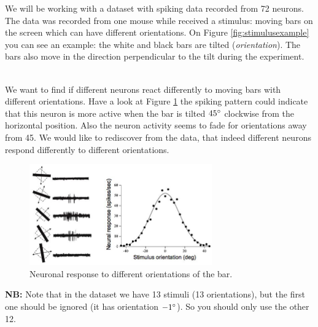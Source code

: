 \documentclass[a4paper,11pt]{article}
\begin{document}
We will be working with a dataset with spiking data recorded from 72 neurons. The data was recorded from one mouse while received a stimulus: moving bars on the screen which can have different orientations. On Figure \ref{fig:stimulusexample} you can see an example: the white and black bars are tilted (\emph{orientation}). The bars also move in the direction perpendicular to the tilt during the experiment. 

\ \\
We want to find if different neurons react differently to moving bars with different orientations. Have a look at Figure \ref{fig:orientationresponse} the spiking pattern could indicate that this neuron is more active when the bar is tilted $45\degree$ clockwise from the horizontal position. Also the neuron activity seems to fade for orientations away from 45. We would like to rediscover from the data, that indeed different neurons respond differently to different orientations.

\begin{figure}[H]
	\centering
	\includegraphics[width=0.7\textwidth]{orientation.jpg} 
	\caption{Neuronal response to different orientations of the bar.}
	\label{fig:orientationresponse}
\end{figure}
\textbf{NB:} Note that in the dataset we have 13 stimuli (13 orientations), but the first one should be ignored (it has orientation $-1\degree$). So you should only use the other 12.
\end{document}
